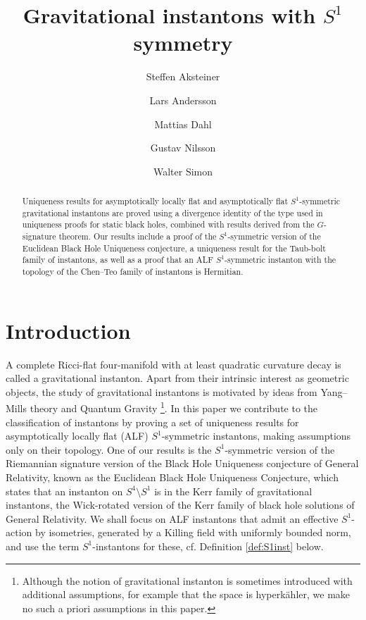\documentclass[a4paper,10pt,reqno]{amsart}
\title{Gravitational instantons with $S^1$ symmetry}
\author[S. Aksteiner]{Steffen Aksteiner}
\author[L. Andersson]{Lars Andersson}
\author[M. Dahl]{Mattias Dahl}
\author[G. Nilsson]{Gustav Nilsson}
\author[W. Simon]{Walter Simon}
\theoremstyle{plain}
\numberwithin{equation}{section}
\begin{document}
\begin{abstract}
Uniqueness results for asymptotically locally flat and asymptotically flat $S^1$-symmetric gravitational instantons are proved using a divergence identity of the type used in uniqueness proofs for static black holes, combined with results derived from the $G$-signature theorem. Our results include a proof of the $S^1$-symmetric version of the Euclidean Black Hole Uniqueness conjecture, a uniqueness result for the Taub-bolt family of instantons, as well as a proof that an ALF $S^1$-symmetric instanton with the topology of the Chen--Teo family of instantons is Hermitian.  
\end{abstract} 

\maketitle
\tableofcontents

%
\section{Introduction}\label{sec:intro}
%

A complete Ricci-flat four-manifold with at least quadratic curvature decay is called a gravitational instanton. Apart from their intrinsic interest as geometric objects, the study of gravitational instantons is motivated by ideas from Yang--Mills theory and Quantum Gravity \cite{hawking:1977:grav:instantons}\footnote{Although the notion of gravitational instanton is sometimes introduced with additional assumptions, for example that the space is hyperk\"ahler, we make no such a priori assumptions in this paper.}. 
In this paper we contribute to the classification of instantons by proving a set of uniqueness results for asymptotically locally flat (ALF) $S^1$-symmetric instantons, making assumptions only on their topology. One of our results is the $S^1$-symmetric version of the Riemannian signature version of the Black Hole Uniqueness conjecture of General Relativity, known as the Euclidean Black Hole Uniqueness Conjecture, which states that an instanton on $S^4\setminus S^1$ is in the Kerr family of gravitational instantons, the Wick-rotated version of the Kerr family of black hole solutions of General Relativity.  We shall focus on ALF instantons that admit an effective $S^1$-action by isometries, generated by a Killing field with uniformly bounded norm, and use the term $S^1$-instantons for these, cf.  Definition \ref{def:S1inst} below. 
\end{document}
